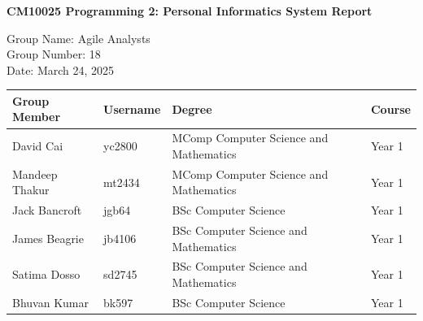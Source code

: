 \documentclass[12pt,a4paper]{article}
\begin{document}
\begin{titlepage}
    \centering
    {\Large\bfseries CM10025 Programming 2: Personal Informatics System Report\par}
    \vspace{1cm}
    Group Name: Agile Analysts \\
    Group Number: 18 \\
    Date: March 24, 2025

    \vspace{2cm}
    \begin{tabular}{llll}
        \toprule
        Group Member & Username & Degree & Course \\
        \midrule
        David Cai & yc2800 & MComp Computer Science and Mathematics & Year 1 \\
        Mandeep Thakur & mt2434 &  MComp Computer Science and Mathematics & Year 1\\
        Jack Bancroft & jgb64 & BSc Computer Science & Year 1\\
        James Beagrie & jb4106 & BSc Computer Science and Mathematics & Year 1\\
        Satima Dosso & sd2745 & BSc Computer Science and Mathematics & Year 1 \\
        Bhuvan Kumar & bk597 & BSc Computer Science & Year 1\\
    \end{tabular}
    \thispagestyle{empty}
\end{titlepage}
\end{document}
